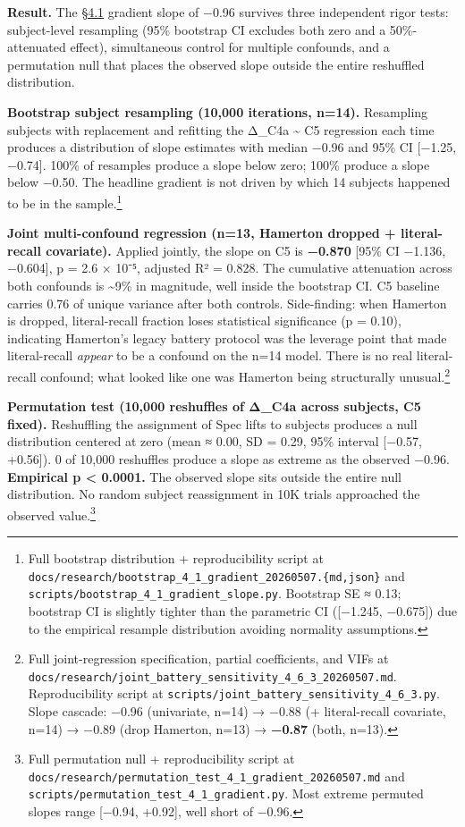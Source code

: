 \textbf{Result.} The \hyperref[the-cross-subject-gradient-and-its-per-question-mechanism]{§4.1} gradient slope of −0.96 survives three
independent rigor tests: subject-level resampling (95\% bootstrap CI
excludes both zero and a 50\%-attenuated effect), simultaneous control
for multiple confounds, and a permutation null that places the observed
slope outside the entire reshuffled distribution.

\textbf{Bootstrap subject resampling (10,000 iterations, n=14).}
Resampling subjects with replacement and refitting the Δ\_C4a
\textasciitilde{} C5 regression each time produces a distribution of
slope estimates with median −0.96 and 95\% CI {[}−1.25, −0.74{]}. 100\%
of resamples produce a slope below zero; 100\% produce a slope below
−0.50. The headline gradient is not driven by which 14 subjects happened
to be in the sample.\footnote{Full bootstrap distribution +
  reproducibility script at
  \texttt{docs/research/bootstrap\_4\_1\_gradient\_20260507.\{md,json\}}
  and \texttt{scripts/bootstrap\_4\_1\_gradient\_slope.py}. Bootstrap SE
  ≈ 0.13; bootstrap CI is slightly tighter than the parametric CI
  ({[}−1.245, −0.675{]}) due to the empirical resample distribution
  avoiding normality assumptions.}

\textbf{Joint multi-confound regression (n=13, Hamerton dropped +
literal-recall covariate).} Applied jointly, the slope on C5 is
\textbf{−0.870} {[}95\% CI −1.136, −0.604{]}, p = 2.6 × 10⁻⁵, adjusted
R² = 0.828. The cumulative attenuation across both confounds is
\textasciitilde9\% in magnitude, well inside the bootstrap CI. C5
baseline carries 0.76 of unique variance after both controls.
Side-finding: when Hamerton is dropped, literal-recall fraction loses
statistical significance (p = 0.10), indicating Hamerton's legacy
battery protocol was the leverage point that made literal-recall
\emph{appear} to be a confound on the n=14 model. There is no real
literal-recall confound; what looked like one was Hamerton being
structurally unusual.\footnote{Full joint-regression specification,
  partial coefficients, and VIFs at
  \texttt{docs/research/joint\_battery\_sensitivity\_4\_6\_3\_20260507.md}.
  Reproducibility script at
  \texttt{scripts/joint\_battery\_sensitivity\_4\_6\_3.py}. Slope
  cascade: −0.96 (univariate, n=14) → −0.88 (+ literal-recall covariate,
  n=14) → −0.89 (drop Hamerton, n=13) → \textbf{−0.87} (both, n=13).}

\textbf{Permutation test (10,000 reshuffles of Δ\_C4a across subjects,
C5 fixed).} Reshuffling the assignment of Spec lifts to subjects
produces a null distribution centered at zero (mean ≈ 0.00, SD = 0.29,
95\% interval {[}−0.57, +0.56{]}). 0 of 10,000 reshuffles produce a
slope as extreme as the observed −0.96. \textbf{Empirical p \textless{}
0.0001.} The observed slope sits outside the entire null distribution.
No random subject reassignment in 10K trials approached the observed
value.\footnote{Full permutation null + reproducibility script at
  \texttt{docs/research/permutation\_test\_4\_1\_gradient\_20260507.md}
  and \texttt{scripts/permutation\_test\_4\_1\_gradient.py}. Most
  extreme permuted slopes range {[}−0.94, +0.92{]}, well short of −0.96.}

